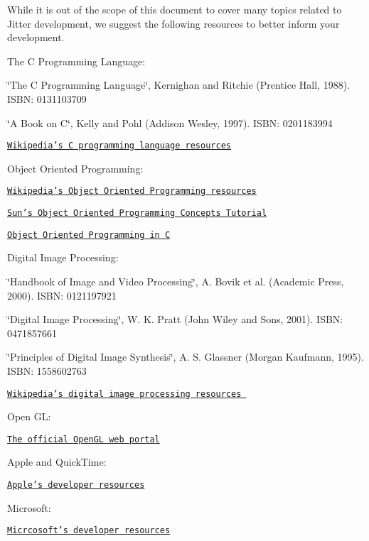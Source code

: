 While it is out of the scope of this document to cover many topics related to Jitter development, we suggest the following resources to better inform your development.

The C Programming Language: 
\begin{DoxyItemize}
\item \char`\"{}The C Programming Language\char`\"{}, Kernighan and Ritchie (Prentice Hall, 1988). ISBN: 0131103709 
\item \char`\"{}A Book on C\char`\"{}, Kelly and Pohl (Addison Wesley, 1997). ISBN: 0201183994  
\item \href{http://en.wikipedia.org/wiki/C_programming_language}{\tt Wikipedia's C programming language resources} 
\end{DoxyItemize}Object Oriented Programming: 
\begin{DoxyItemize}
\item \href{http://en.wikipedia.org/wiki/Object-oriented_programming}{\tt Wikipedia's Object Oriented Programming resources} 
\item \href{http://java.sun.com/docs/books/tutorial/java/concepts/index.html}{\tt Sun's Object Oriented Programming Concepts Tutorial} 
\item \href{http://www.accu.org/acornsig/public/articles/oop_c.html}{\tt Object Oriented Programming in C} 
\end{DoxyItemize}

Digital Image Processing: 
\begin{DoxyItemize}
\item \char`\"{}Handbook of Image and Video Processing\char`\"{}, A. Bovik et al. (Academic Press, 2000). ISBN: 0121197921  
\item \char`\"{}Digital Image Processing\char`\"{}, W. K. Pratt (John Wiley and Sons, 2001). ISBN: 0471857661  
\item \char`\"{}Principles of Digital Image Synthesis\char`\"{}, A. S. Glassner (Morgan Kaufmann, 1995). ISBN: 1558602763  
\item \href{http://en.wikipedia.org/wiki/Digital_image_processing}{\tt Wikipedia's digital image processing resources } 
\end{DoxyItemize}

Open GL: 
\begin{DoxyItemize}
\item \href{http://www.opengl.org/}{\tt The official OpenGL web portal} 
\end{DoxyItemize}

Apple and QuickTime: 
\begin{DoxyItemize}
\item \href{http://developer.apple.com/}{\tt Apple's developer resources} 
\end{DoxyItemize}

Microsoft: 
\begin{DoxyItemize}
\item \href{http://msdn.microsoft.com/}{\tt Micrcosoft's developer resources} 
\end{DoxyItemize}
